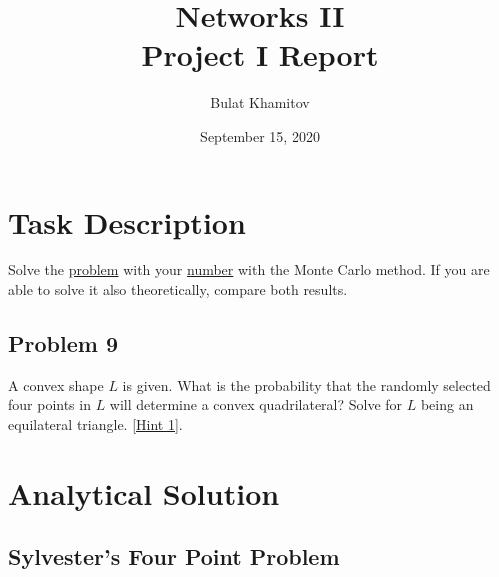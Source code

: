 \documentclass{article}
\title{Networks II \\ Project I Report}
\author{Bulat Khamitov}
\date{September 15, 2020}
\begin{document}
\maketitle

\tableofcontents

\section{Task Description}

Solve the \href{http://vladowiki.fmf.uni-lj.si/doku.php?id=ru:hse:snet:problems}{problem} with your \href{http://vladowiki.fmf.uni-lj.si/doku.php?id=ru:hse:snet19:students}{number} with the Monte Carlo method. 
If you are able to solve it also theoretically, compare both results.

\subsection*{Problem 9}

A convex shape $L$ is given.
What is the probability that the randomly selected four points in $L$ will determine a convex quadrilateral? 
Solve for $L$ being an equilateral triangle. 
\href{http://vladowiki.fmf.uni-lj.si/doku.php?id=ru:hse:snet:problems#hint_1}{[Hint 1]}.

\newpage

\section{Analytical Solution}

\subsection{Sylvester's Four Point Problem}
\end{document}
